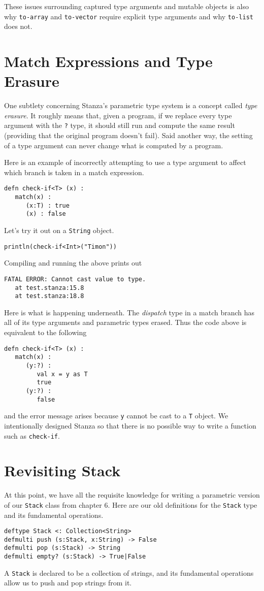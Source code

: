 \documentclass[10pt,oneside]{book}
\begin{document}
These issues surrounding captured type arguments and mutable objects is also why \texttt{\frenchspacing to-array} and \texttt{\frenchspacing to-vector} require explicit type arguments and why \texttt{\frenchspacing to-list} does not.

\section{Match Expressions and Type Erasure}
One subtlety concerning Stanza's parametric type system is a concept called {\em type erasure}. It roughly means that, given a program, if we replace every type argument with the \texttt{\frenchspacing ?} type, it should still run and compute the same result (providing that the original program doesn't fail). Said another way, the setting of a type argument can never change what is computed by a program.

Here is an example of incorrectly attempting to use a type argument to affect which branch is taken in a match expression.
\begin{lstlisting}
defn check-if<T> (x) :
   match(x) :
      (x:T) : true
      (x) : false
\end{lstlisting}
Let's try it out on a \texttt{\frenchspacing String} object.
\begin{lstlisting}
println(check-if<Int>("Timon"))
\end{lstlisting}
Compiling and running the above prints out
\begin{lstlisting}
FATAL ERROR: Cannot cast value to type.
   at test.stanza:15.8
   at test.stanza:18.8
\end{lstlisting}

Here is what is happening underneath. The {\em dispatch} type in a match branch has all of its type arguments and parametric types erased. Thus the code above is equivalent to the following
\begin{lstlisting}
defn check-if<T> (x) :
   match(x) :
      (y:?) :
         val x = y as T
         true
      (y:?) :
         false
\end{lstlisting}
and the error message arises because \texttt{\frenchspacing y} cannot be cast to a \texttt{\frenchspacing T} object. We intentionally designed Stanza so that there is no possible way to write a function such as \texttt{\frenchspacing check-if}.

\section{Revisiting Stack}
At this point, we have all the requisite knowledge for writing a parametric version of our \texttt{\frenchspacing Stack} class from chapter 6. Here are our old definitions for the \texttt{\frenchspacing Stack} type and its fundamental operations.
\begin{lstlisting}
deftype Stack <: Collection<String>
defmulti push (s:Stack, x:String) -> False
defmulti pop (s:Stack) -> String
defmulti empty? (s:Stack) -> True|False
\end{lstlisting}
A \texttt{\frenchspacing Stack} is declared to be a collection of strings, and its fundamental operations allow us to push and pop strings from it.
\end{document}
